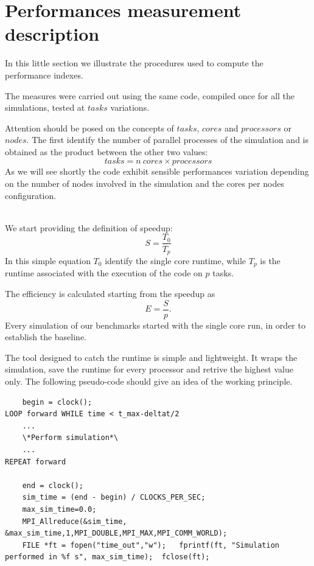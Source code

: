 \section{Performances measurement description}
In this little section we illustrate the procedures used to compute the performance indexes.\par
The measures were carried out using the same code, compiled once for all the simulations, tested at $tasks$ variations.\par
Attention should be posed on the concepts of $tasks$, $cores$ and $processors$ or $nodes$. The first identify the number of parallel processes of the simulation and is obtained as the product between the other two values:
\begin{equation*}
tasks = n~cores \times processors
\end{equation*}
 As we will see shortly the code exhibit sensible performances variation depending on the number of nodes involved in the simulation and the cores per nodes configuration. \\~\par
We start providing the definition of speedup:
\begin{equation*}
S = \frac{T_{0}}{T_{p}}
\end{equation*}
In this simple equation $T_{0}$ identify the single core runtime, while $T_{p}$ is the runtime associated with the execution of the code on $p$ tasks. \par
The efficiency is calculated starting from the speedup as 
\begin{equation*}
E = \frac{S}{p}.
\end{equation*}
Every simulation of our benchmarks started with the single core run, in order to establish the baseline. \par
The tool designed to catch the runtime is simple and lightweight. It wraps the simulation, save the runtime for every processor and retrive the highest value only.
The following pseudo-code should give an idea of the working principle.

\begin{lstlisting}
	begin = clock();
LOOP forward WHILE time < t_max-deltat/2
	...
	\*Perform simulation*\
	...
REPEAT forward

	end = clock();
	sim_time = (end - begin) / CLOCKS_PER_SEC; 
	max_sim_time=0.0;
	MPI_Allreduce(&sim_time, &max_sim_time,1,MPI_DOUBLE,MPI_MAX,MPI_COMM_WORLD); 
	FILE *ft = fopen("time_out","w");	fprintf(ft, "Simulation performed in %f s", max_sim_time); 	fclose(ft);
\end{lstlisting}



